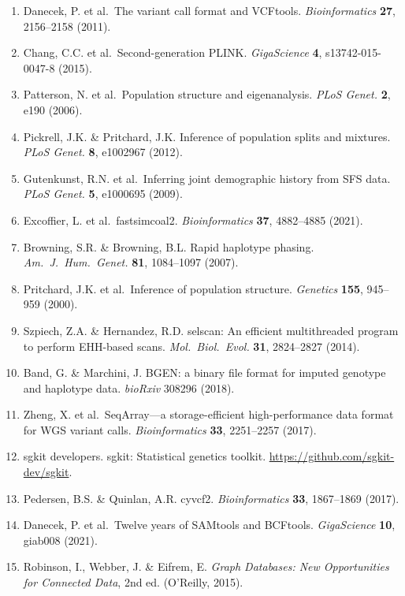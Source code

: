 \documentclass[11pt,a4paper]{article}
\begin{document}
\begin{enumerate}
\item[{[S1]}] Danecek, P. et al.\ The variant call format and VCFtools. \textit{Bioinformatics} \textbf{27}, 2156--2158 (2011).
\item[{[S2]}] Chang, C.C. et al.\ Second-generation PLINK. \textit{GigaScience} \textbf{4}, s13742-015-0047-8 (2015).
\item[{[S3]}] Patterson, N. et al.\ Population structure and eigenanalysis. \textit{PLoS Genet.} \textbf{2}, e190 (2006).
\item[{[S4]}] Pickrell, J.K. \& Pritchard, J.K. Inference of population splits and mixtures. \textit{PLoS Genet.} \textbf{8}, e1002967 (2012).
\item[{[S5]}] Gutenkunst, R.N. et al.\ Inferring joint demographic history from SFS data. \textit{PLoS Genet.} \textbf{5}, e1000695 (2009).
\item[{[S6]}] Excoffier, L. et al.\ fastsimcoal2. \textit{Bioinformatics} \textbf{37}, 4882--4885 (2021).
\item[{[S7]}] Browning, S.R. \& Browning, B.L. Rapid haplotype phasing. \textit{Am.\ J.\ Hum.\ Genet.} \textbf{81}, 1084--1097 (2007).
\item[{[S8]}] Pritchard, J.K. et al.\ Inference of population structure. \textit{Genetics} \textbf{155}, 945--959 (2000).
\item[{[S9]}] Szpiech, Z.A. \& Hernandez, R.D. selscan: An efficient multithreaded program to perform EHH-based scans. \textit{Mol.\ Biol.\ Evol.} \textbf{31}, 2824--2827 (2014).
\item[{[S10]}] Band, G. \& Marchini, J. BGEN: a binary file format for imputed genotype and haplotype data. \textit{bioRxiv} 308296 (2018).
\item[{[S11]}] Zheng, X. et al.\ SeqArray---a storage-efficient high-performance data format for WGS variant calls. \textit{Bioinformatics} \textbf{33}, 2251--2257 (2017).
\item[{[S12]}] sgkit developers. sgkit: Statistical genetics toolkit. \url{https://github.com/sgkit-dev/sgkit}.
\item[{[S13]}] Pedersen, B.S. \& Quinlan, A.R. cyvcf2. \textit{Bioinformatics} \textbf{33}, 1867--1869 (2017).
\item[{[S14]}] Danecek, P. et al.\ Twelve years of SAMtools and BCFtools. \textit{GigaScience} \textbf{10}, giab008 (2021).
\item[{[S15]}] Robinson, I., Webber, J. \& Eifrem, E. \textit{Graph Databases: New Opportunities for Connected Data}, 2nd ed. (O'Reilly, 2015).

\end{enumerate}
\end{document}
